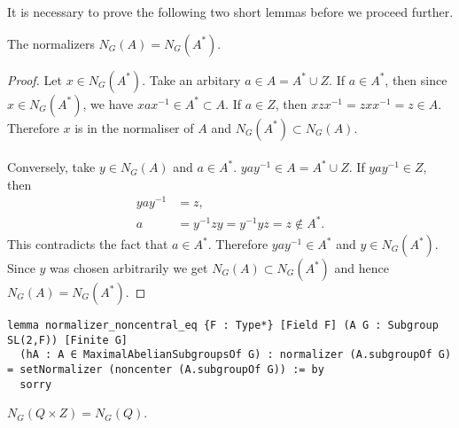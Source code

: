 It is necessary to prove the following two short lemmas before we proceed further.
 
\begin{lemma}
\label{normalizer_noncentral_eq}
\leanok
 The normalizers $N_G(A) =N_G(A^*)$.
\end{lemma}
\begin{proof}
Let $x \in N_G(A^*)$. Take an arbitary $a \in A = A^* \cup Z$. If $a \in A^*$, then since  $x \in N_G(A^*)$, we have $xax^{-1} \in A^* \subset A$. If $a \in Z$, then $xzx^{-1} = zxx^{-1} = z \in A$. Therefore $x$ is in the normaliser of $A$ and $N_G(A^*) \subset N_G(A)$. \\
\\
Conversely, take $y \in N_G(A)$ and $a \in A^*$. $yay^{-1} \in A = A^* \cup Z$. If  $yay^{-1} \in Z$, then
\begin{align*} yay^{-1} &= z, \tag{some $z \in Z$}
\\ a &= y^{-1}zy = y^{-1}yz = z \not \in A^*.
\end{align*}
This contradicts the fact that $a \in A^*$. Therefore $yay^{-1} \in A^*$ and $y \in N_G(A^*)$. Since $y$ was chosen arbitrarily we get $N_G(A) \subset N_G(A^*)$ and hence $N_G(A) =N_G(A^*)$.
\end{proof}
\begin{footnotesize}
\begin{verbatim}
lemma normalizer_noncentral_eq {F : Type*} [Field F] (A G : Subgroup SL(2,F)) [Finite G]
  (hA : A ∈ MaximalAbelianSubgroupsOf G) : normalizer (A.subgroupOf G) = setNormalizer (noncenter (A.subgroupOf G)) := by
  sorry
\end{verbatim}
\end{footnotesize}

\begin{lemma}
\label{normalizer_Sylow_join_center_eq_normalizer_Sylow}
\leanok
$N_G(Q \times Z) = N_G(Q)$.
\end{lemma}

